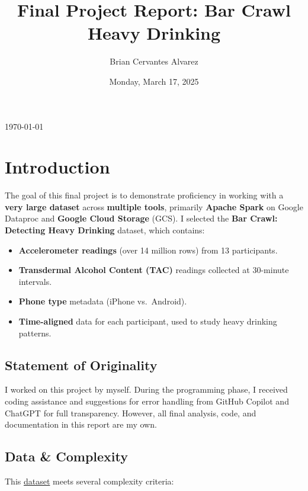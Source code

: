 \documentclass[
  letterpaper,
  DIV=11,
  numbers=noendperiod]{scrartcl}
\title{Final Project Report: Bar Crawl Heavy Drinking}
\author{Brian Cervantes Alvarez}
\date{Monday, March 17, 2025}
\makeatletter
\providecommand{\tightlist}{%
  \setlength{\itemsep}{0pt}\setlength{\parskip}{0pt}}\usepackage{longtable,booktabs,array}
\renewcommand{\maketitle}{
    \bgroup
    \begin{flushleft}
        \begin{spacing}{1.25}
        {\sffamily\fontsize{25}{20}\textbf{\capitalisewords{\@title}}} \vspace{0.3cm} \newline
        {\large\@author} \newline
        {\large\today} \newline %
        {\large {\@subtitle}} \vspace{-1cm}
        \end{spacing} %
    \end{flushleft}
    \egroup
}
\makeatother
\begin{document}
\maketitle

\pagestyle{mystyle}


\section{Introduction}\label{introduction}

The goal of this final project is to demonstrate proficiency in working
with a \textbf{very large dataset} across \textbf{multiple tools},
primarily \textbf{Apache Spark} on Google Dataproc and \textbf{Google
Cloud Storage} (GCS). I selected the \textbf{Bar Crawl: Detecting Heavy
Drinking} dataset, which contains:

\begin{itemize}
\tightlist
\item
  \textbf{Accelerometer readings} (over 14 million rows) from 13
  participants.
\item
  \textbf{Transdermal Alcohol Content (TAC)} readings collected at
  30-minute intervals.
\item
  \textbf{Phone type} metadata (iPhone vs.~Android).
\item
  \textbf{Time-aligned} data for each participant, used to study heavy
  drinking patterns.
\end{itemize}

\subsection{Statement of Originality}\label{statement-of-originality}

I worked on this project by myself. During the programming phase, I
received coding assistance and suggestions for error handling from
GitHub Copilot and ChatGPT for full transparency. However, all final
analysis, code, and documentation in this report are my own.

\subsection{Data \& Complexity}\label{data-complexity}

This
\href{https://archive.ics.uci.edu/dataset/515/bar+crawl+detecting+heavy+drinking}{dataset}
meets several complexity criteria:
\end{document}
